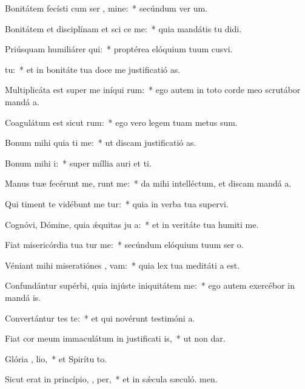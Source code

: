 \item Bonitátem fecísti cum ser , mine:~* secúndum ver um.
\item Bonitátem et disciplínam et sci ce me:~* quia mandátis tu didi.
\item Priúsquam humiliárer  qui:~* proptérea elóquium tuum cusvi.
\item {}  tu:~* et in bonitáte tua doce me justificatió as.
\item Multiplicáta est super me iníqui rum:~* ego autem in toto corde meo scrutábor mandá a.
\item Coagulátum est sicut   rum:~* ego vero legem tuam metus sum.
\item Bonum mihi quia ti me:~* ut discam justificatió as.
\item Bonum mihi   i:~* super míllia auri et ti.
\item Manus tuæ fecérunt me,  runt me:~* da mihi intelléctum, et discam mandá a.
\item Qui timent te vidébunt me  tur:~* quia in verba tua supervi.
\item Cognóvi, Dómine, quia ǽquitas ju a:~* et in veritáte tua humiti me.
\item Fiat misericórdia tua  tur me:~* secúndum elóquium tuum ser o.
\item Véniant mihi miseratiónes ,  vam:~* quia lex tua meditáti a est.
\item Confundántur supérbi, quia injúste iniquitátem   me:~* ego autem exercébor in mandá is.
\item Convertántur  tes te:~* et qui novérunt testimóni a.
\item Fiat cor meum immaculátum in justificati is,~* ut non dar.
\item Glória ,  lio,~* et Spirítu to.
\item Sicut erat in princípio,  ,  per,~* et in sǽcula sæculó. men.
